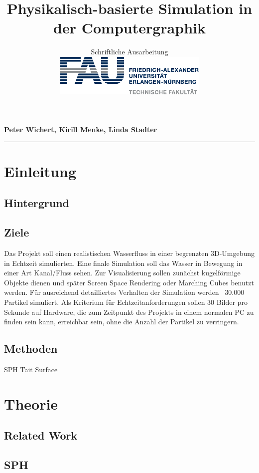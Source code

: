 \documentclass[a4paper]{paper}
\title{Physikalisch-basierte Simulation in der Computergraphik}
\subtitle{Schriftliche Ausarbeitung\\
\hfill\includegraphics[height=2cm]{fau-logo-tech.pdf}
\vspace{-2cm}}
\author{\ProjectTitle}
\newcommand{\StudentNames}{Peter Wichert, Kirill Menke, Linda Stadter}
\begin{document}
 
\maketitle 
\textbf{\StudentNames} \\
\hrule\bigskip



\section{Einleitung} 
\subsection{Hintergrund}

\subsection{Ziele}
Das Projekt soll einen realistischen Wasserfluss in einer begrenzten 3D-Umgebung in Echtzeit simulierten. %
Eine finale Simulation soll das Wasser in Bewegung in einer Art Kanal/Fluss sehen.
Zur Visualisierung sollen zunächst kugelförmige Objekte dienen und später Screen Space Rendering oder Marching Cubes benutzt werden. 
Für ausreichend detailliertes Verhalten der Simulation werden ~30.000 Partikel simuliert. Als Kriterium für Echtzeitanforderungen sollen 30 Bilder pro Sekunde auf Hardware, die zum Zeitpunkt des Projekts in einem normalen PC zu finden sein kann, erreichbar sein, ohne die Anzahl der Partikel zu verringern. 
\subsection{Methoden}
SPH
Tait
Surface

\section{Theorie}
\subsection{Related Work}%
\subsection{SPH}
\end{document}
